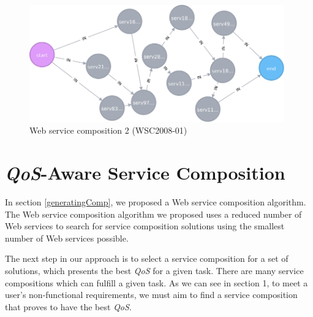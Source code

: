 \begin{figure}[H]
\includegraphics[width=11cm]{svg-chapter3-c2.pdf}
\centering
\caption{Web service composition 2 (WSC2008-01)}
\label{fig:c3compEg2} 
\end{figure} 

\section{\emph{QoS}-Aware Service Composition}

In section \ref{generatingComp}, we proposed a Web service composition algorithm. The Web service composition algorithm we proposed uses a reduced number of Web services to search for service composition solutions using the smallest number of Web services possible.\par

The next step in our approach is to select a service composition for a set of solutions, which presents the best \emph{QoS} for a given task. There are many service compositions which can fulfill a given task. As we can see in section 1, to meet a user's non-functional requirements, we must aim to find a service composition that proves to have the best \emph{QoS}.\par

